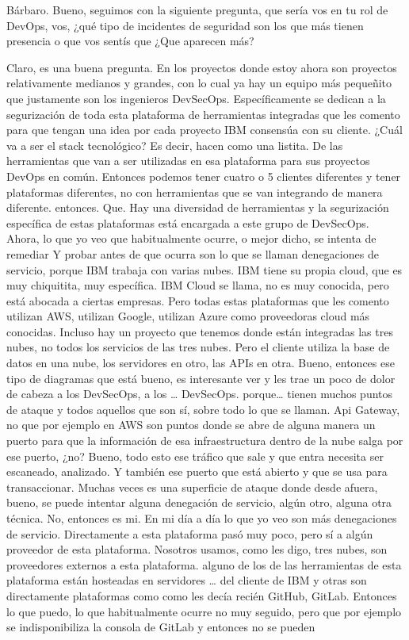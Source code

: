 \begin{description}[leftmargin=0cm, labelsep=0.5cm]
    \item[\textbf{MUNTAABSKI FEDERICO:}] Bárbaro. Bueno, seguimos con la siguiente pregunta, que sería vos en tu rol de DevOps, vos, ¿qué tipo de incidentes de seguridad son los que más tienen presencia o que vos sentís que ¿Que aparecen más?

    \item[\textbf{VILLARINO PABLO RODOLFO:}] Claro, es una buena pregunta. En los proyectos donde estoy ahora son proyectos relativamente medianos y grandes, con lo cual ya hay un equipo más pequeñito que justamente son los ingenieros DevSecOps. Específicamente se dedican a la segurización de toda esta plataforma de herramientas integradas que les comento para que tengan una idea por cada proyecto IBM consensúa con su cliente. ¿Cuál va a ser el stack tecnológico? Es decir, hacen como una listita. De las herramientas que van a ser utilizadas en esa plataforma para sus proyectos DevOps en común. Entonces podemos tener cuatro o 5 clientes diferentes y tener plataformas diferentes, no con herramientas que se van integrando de manera diferente. entonces. Que. Hay una diversidad de herramientas y la segurización específica de estas plataformas está encargada a este grupo de DevSecOps. Ahora, lo que yo veo que habitualmente ocurre, o mejor dicho, se intenta de remediar Y probar antes de que ocurra son lo que se llaman denegaciones de servicio, porque IBM trabaja con varias nubes. IBM tiene su propia cloud, que es muy chiquitita, muy específica. IBM Cloud se llama, no es muy conocida, pero está abocada a ciertas empresas. Pero todas estas plataformas que les comento utilizan AWS, utilizan Google, utilizan Azure como proveedoras cloud más conocidas. Incluso hay un proyecto que tenemos donde están integradas las tres nubes, no todos los servicios de las tres nubes. Pero el cliente utiliza la base de datos en una nube, los servidores en otro, las APIs en otra. Bueno, entonces ese tipo de diagramas que está bueno, es interesante ver y les trae un poco de dolor de cabeza a los DevSecOps, a los … DevSecOps. porque… tienen muchos puntos de ataque y todos aquellos que son sí, sobre todo lo que se llaman. Api Gateway, no que por ejemplo en AWS son puntos donde se abre de alguna manera un puerto para que la información de esa infraestructura dentro de la nube salga por ese puerto, ¿no? Bueno, todo esto ese tráfico que sale y que entra necesita ser escaneado, analizado. Y también ese puerto que está abierto y que se usa para transaccionar. Muchas veces es una superficie de ataque donde desde afuera, bueno, se puede intentar alguna denegación de servicio, algún otro, alguna otra técnica. No, entonces es mi. En mi día a día lo que yo veo son más denegaciones de servicio. Directamente a esta plataforma pasó muy poco, pero sí a algún proveedor de esta plataforma. Nosotros usamos, como les digo, tres nubes, son proveedores externos a esta plataforma. alguno de los de las herramientas de esta plataforma están hosteadas en servidores … del cliente de IBM y otras son directamente plataformas como como les decía recién GitHub, GitLab. Entonces lo que puedo, lo que habitualmente ocurre no muy seguido, pero que por ejemplo se indisponibiliza la consola de GitLab y entonces no se pueden 
\end{description}
